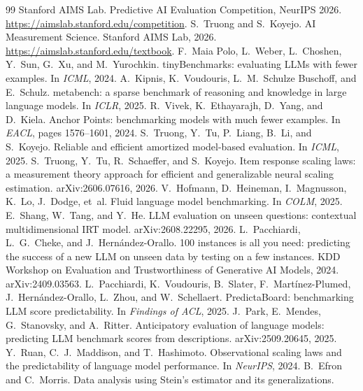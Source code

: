 \documentclass{article}
\begin{document}
\begin{thebibliography}{99}\small
{} Stanford AIMS Lab. Predictive AI Evaluation Competition, NeurIPS 2026.
  \url{https://aimslab.stanford.edu/competition}.
 S.~Truong and S.~Koyejo. AI Measurement Science. Stanford AIMS Lab, 2026. \url{https://aimslab.stanford.edu/textbook}.
 F.~Maia Polo, L.~Weber, L.~Choshen, Y.~Sun, G.~Xu, and M.~Yurochkin. tinyBenchmarks: evaluating
  LLMs with fewer examples. In \emph{ICML}, 2024.
 A.~Kipnis, K.~Voudouris, L.~M.~Schulze Buschoff, and E.~Schulz. metabench: a sparse benchmark of
  reasoning and knowledge in large language models. In \emph{ICLR}, 2025.
 R.~Vivek, K.~Ethayarajh, D.~Yang, and D.~Kiela. Anchor Points: benchmarking models with much fewer
  examples. In \emph{EACL}, pages 1576--1601, 2024.
 S.~Truong, Y.~Tu, P.~Liang, B.~Li, and S.~Koyejo. Reliable and efficient amortized model-based
  evaluation. In \emph{ICML}, 2025.
 S.~Truong, Y.~Tu, R.~Schaeffer, and S.~Koyejo. Item response scaling laws: a measurement
  theory approach for efficient and generalizable neural scaling estimation. arXiv:2606.07616, 2026.
 V.~Hofmann, D.~Heineman, I.~Magnusson, K.~Lo, J.~Dodge, et~al. Fluid language model
  benchmarking. In \emph{COLM}, 2025.
 E.~Shang, W.~Tang, and Y.~He. LLM evaluation on unseen questions: contextual multidimensional IRT
  model. arXiv:2608.22295, 2026.
 L.~Pacchiardi, L.~G.~Cheke, and J.~Hern\'andez-Orallo. 100 instances is all you need:
  predicting the success of a new LLM on unseen data by testing on a few instances. KDD Workshop on Evaluation and
  Trustworthiness of Generative AI Models, 2024. arXiv:2409.03563.
 L.~Pacchiardi, K.~Voudouris, B.~Slater, F.~Mart\'inez-Plumed, J.~Hern\'andez-Orallo,
  L.~Zhou, and W.~Schellaert. PredictaBoard: benchmarking LLM score predictability. In \emph{Findings of ACL}, 2025.
 J.~Park, E.~Mendes, G.~Stanovsky, and A.~Ritter. Anticipatory evaluation of language models: predicting LLM
  benchmark scores from descriptions. arXiv:2509.20645, 2025.
 Y.~Ruan, C.~J.~Maddison, and T.~Hashimoto. Observational scaling laws and the predictability of
  language model performance. In \emph{NeurIPS}, 2024.
 B.~Efron and C.~Morris. Data analysis using Stein's estimator and its generalizations.

\end{thebibliography}
\end{document}
